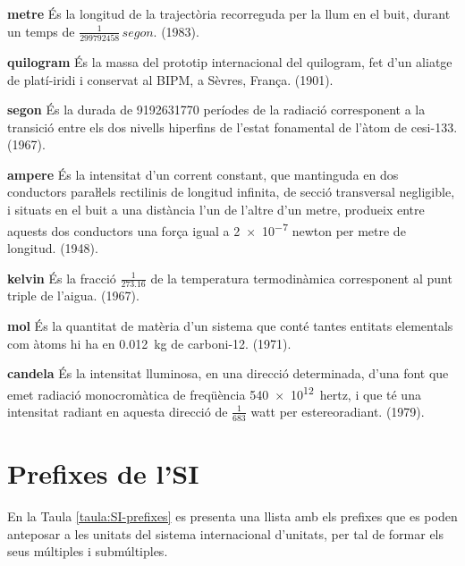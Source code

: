 \begin{list}{}
   {\setlength{\labelwidth}{22mm} \setlength{\leftmargin}{22mm} \setlength{\labelsep}{2mm}}
   \item[\textbf{metre}] És la longitud de la trajectòria recorreguda per la llum
   en el buit, durant un temps de $\frac{1}{\num{299792458}}\si{\,segon}$. (1983).
   \item[\textbf{quilogram}] És la massa del prototip internacional del quilogram, fet d'un aliatge de platí-iridi i
    conservat al BIPM, a Sèvres, França. (1901).
   \item[\textbf{segon}] És la durada de \num{9192631770} períodes de la
   radiació corresponent a la transició entre els dos nivells
  hiperfins de l'estat fonamental de l'àtom de cesi-133. (1967).
   \item[\textbf{ampere}] És la intensitat d'un corrent constant,
   que mantinguda en dos conductors paraŀlels rectilinis de longitud
   infinita, de secció transversal negligible, i situats en el buit a una
   distància l'un de l'altre d'un metre, produeix entre
   aquests dos conductors  una força igual a \num{2e-7} newton per metre de longitud. (1948).
   \item[\textbf{kelvin}] És la fracció $\frac{1}{\num{273,16}}$ de la temperatura
   termodinàmica corresponent al punt triple de l'aigua. (1967).
   \item[\textbf{mol}] És la quantitat de matèria d'un sistema que conté tantes
   entitats elementals com àtoms hi ha en \SI{0,012}{kg} de carboni-12. (1971).
   \item[\textbf{candela}] És la intensitat lluminosa, en una direcció determinada,
   d'una font que emet radiació monocromàtica de freqüència \SI{540e12}{hertz}, i
   que té una intensitat radiant en aquesta direcció de $\frac{1}{683}$ watt per estereoradiant. (1979).
\end{list}


\section{Prefixes de l'SI}

En la Taula \vref{taula:SI-prefixes} es presenta una llista amb els
prefixes que es poden anteposar a les unitats del sistema
internacional d'unitats, per tal de formar els seus múltiples i
submúltiples.

